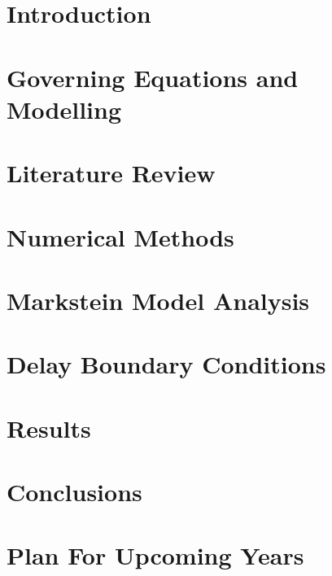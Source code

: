 \documentclass[lmr,second,hyperref,rgb,hyperref,dvipsnames]{uom_thesis_casson}
\title{\xmp@Title}
\author{\xmp@Author}
\begin{document}
\maketitle



\uomtoc

\uomstartmainbody %

\chapter{Introduction} \label{ch:intro}


\chapter{Governing Equations and Modelling} \label{ch:govern-eqns}


\chapter{Literature Review} \label{ch:lit-review}


\chapter{Numerical Methods} \label{ch:techniques}


\chapter{Markstein Model Analysis} \label{ch:markstein}


\chapter{Delay Boundary Conditions} \label{ch:delay-bcs}


\chapter{Results} \label{ch:delay-bcs-results}


\chapter{Conclusions} \label{ch:conc}


\chapter{Plan For Upcoming Years} \label{ch:plan}



\printbibliography[title={References},heading=bibintoc]
\end{document}
